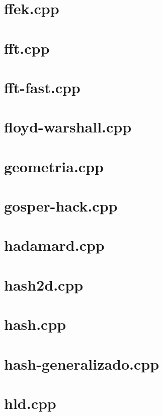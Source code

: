 \documentclass[a4paper,12pt]{article}
\begin{document}
\section{ffek.cpp}


\section{fft.cpp}


\section{fft-fast.cpp}


\section{floyd-warshall.cpp}


\section{geometria.cpp}


\section{gosper-hack.cpp}


\section{hadamard.cpp}


\section{hash2d.cpp}


\section{hash.cpp}


\section{hash-generalizado.cpp}


\section{hld.cpp}

\end{document}
